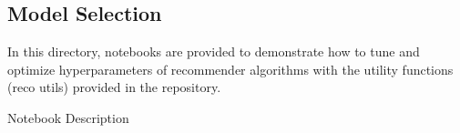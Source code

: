 \subsection{Model Selection}

In this directory, notebooks are provided to demonstrate how to tune and optimize hyperparameters of recommender algorithms with the utility functions (reco utils) provided in the repository.

Notebook	Description
